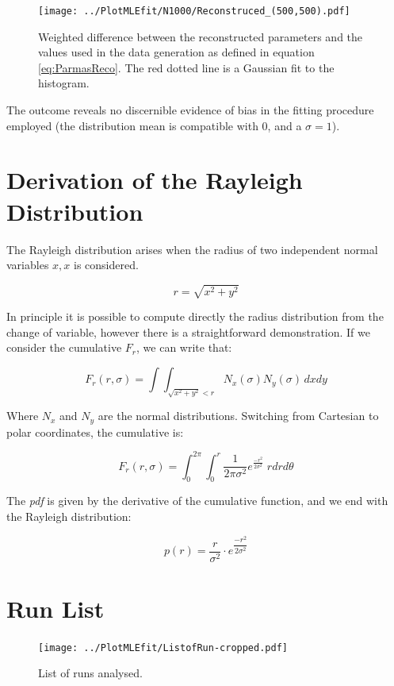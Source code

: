 \documentclass[11pt,a4paper,oneside]{article}
\begin{document}
\begin{figure}[hbtp]
\centering
\texttt{[image: ../PlotMLEfit/N1000/Reconstruced\_(500,500).pdf]}
\caption{Weighted difference between the reconstructed parameters and the values used in the data generation as defined in equation \ref{eq:ParmasReco}. The red dotted line is a Gaussian fit to the histogram.}
\label{fig:ReconstructedParameters}
\end{figure}

The outcome reveals no discernible evidence of bias in the fitting procedure employed (the distribution mean is compatible with $0$, and a $\sigma = 1$).

\appendix
\section{Derivation of the Rayleigh Distribution}
\label{sec:Rayleigh}

The Rayleigh distribution arises when the radius of two independent normal variables $x,x$ is considered.

\begin{equation*}
r = \sqrt{x^{2} + y^{2}}
\end{equation*} 


In principle it is possible to compute directly the radius distribution from the change of variable, however there is a straightforward demonstration. If we consider the cumulative $F_{r}$, we can write that:

\begin{equation*}
F_{r}(r, \sigma) = \int \int_{ \sqrt{x^{2} + y^{2}} < r} N_{x}(\sigma) N_{y}(\sigma) \, dx dy
\end{equation*}

Where $N_{x}$ and $N_{y}$ are the normal distributions. Switching from Cartesian to polar coordinates, the cumulative is:

\begin{equation*}
F_{r}(r, \sigma) =  \int_{0}^{2 \pi} \int_{0}^{r} \frac{1}{2 \pi \sigma^{2}}  e^{ \frac{- r^{2}}{2 \sigma^{2}}} \; r  dr d\theta
\end{equation*}


The \textit{pdf} is given by the derivative of the cumulative function, and we end with the Rayleigh distribution:


\begin{equation}
p(r) = \frac{r}{\sigma^{2}} \cdot  e^{ \dfrac{- r^{2}}{ 2 \sigma^{2}}}
\end{equation}


\section{Run List}
\label{fig:RunList}

\begin{figure}[hbtp]
\centering
\texttt{[image: ../PlotMLEfit/ListofRun-cropped.pdf]}
\caption{List of runs analysed.}
\end{figure}
\end{document}

